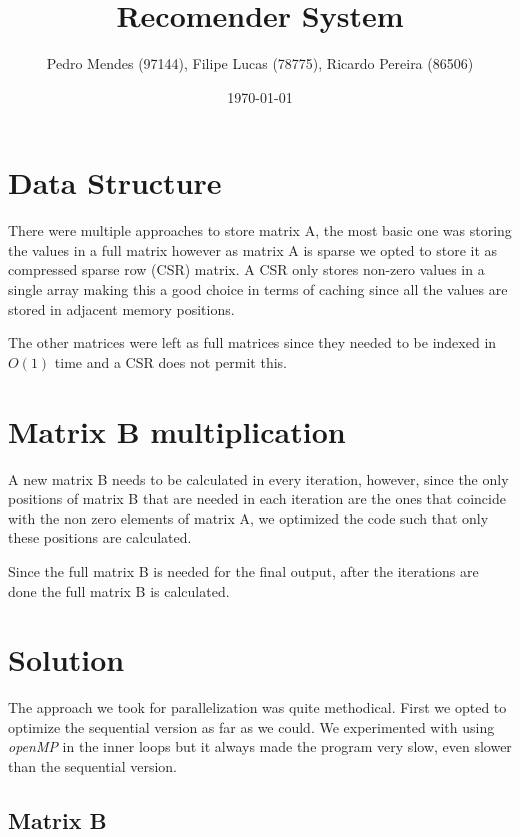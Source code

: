 \documentclass[a4paper]{article}
\begin{document}
\title{Recomender System}
\author{Pedro Mendes (97144), Filipe Lucas (78775), Ricardo Pereira (86506)}
\date{\today}
\maketitle

\section{Data Structure}
There were multiple approaches to store matrix A, the most basic one was
storing the values in a full matrix however as matrix A is sparse
we opted to store it as compressed sparse row (CSR) matrix. A CSR only stores
non-zero values in a single array making this a good choice in terms of
caching since all the values are stored in adjacent memory positions.

The other matrices were left as full matrices since they needed to be indexed in
$O(1)$ time and a CSR does not permit this.

\section{Matrix B multiplication}
A new matrix B needs to be calculated in every iteration, however, since the only
positions of matrix B that are needed in each iteration are the ones that
coincide with the non zero elements of matrix A, we optimized the code such that
only these positions are calculated.

Since the full matrix B is needed for the final output, after the iterations are
done the full matrix B is calculated.

\section{Solution}




The approach we took for parallelization was quite methodical. First we opted to
optimize the sequential version as far as we could. We experimented with using
\textit{openMP} in the inner loops but it always made the program very slow, even slower
than the sequential version.

\subsection{Matrix B}
\end{document}
